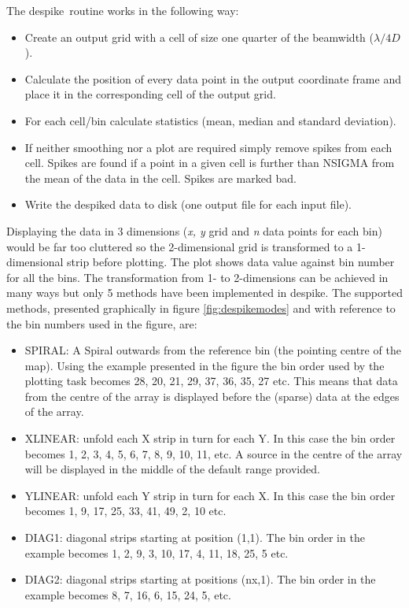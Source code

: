 \documentclass[twoside,11pt]{article}
\newcommand{\task}[1]{{\sf #1}}
\newcommand{\despike}{\htmlref{\task{despike}}{DESPIKE}}
\newcommand{\htmlref}[2]{#1}
\begin{document}
  The \despike\ routine works in the following way:
     
\begin{itemize}
\item Create an output grid with a cell of size one quarter of the beamwidth ($\lambda/4D$).
\item Calculate the position of every data point in the output coordinate
           frame and place it in the corresponding cell of the output grid.
\item For each cell/bin calculate statistics (mean, median and standard
           deviation).
\item If neither smoothing nor a plot are required simply remove spikes
           from each cell. Spikes are found if a point in a given cell is
further than  NSIGMA from the mean of the data in the cell. Spikes are marked
bad. 
\item Write the despiked data to disk (one output file for each input
           file).

\end{itemize}

Displaying the data in 3 dimensions (\textit{x, y} grid and \textit{n} data points
for each bin) would be far too cluttered so the 2-dimensional grid is
transformed to a 1-dimensional strip before plotting. The plot shows data
value against bin  number for all the bins. The transformation from 1- to
2-dimensions can be achieved in many ways but only 5 methods have been
implemented in \despike.  The supported methods, presented graphically in
figure \ref{fig:despikemodes} and with reference to the bin numbers used in
the figure, are:


\begin{itemize} 

\item SPIRAL: A Spiral
outwards from the reference bin (the pointing centre of the map). Using the example presented in the figure
the bin order used by the plotting task becomes 28, 20, 21, 29, 37, 36, 35,
27 etc. This means that data from the centre of the array is displayed before
the (sparse) data at the edges of the array.

	\item XLINEAR: unfold each X strip in turn for each Y. In this case
the bin order becomes 1, 2, 3, 4, 5, 6, 7, 8, 9, 10, 11, etc. A source in
the centre of the array will be displayed in the middle of the default range
provided. 

	\item YLINEAR:  unfold each Y strip in turn for each X. In this case
the bin order becomes 1, 9, 17, 25, 33, 41, 49, 2, 10 etc.    

	\item DIAG1:    diagonal strips starting at position (1,1). The bin
order in the example becomes 1, 2, 9, 3, 10, 17, 4, 11, 18, 25, 5 etc.

	\item DIAG2:   diagonal strips starting at positions (nx,1). The bin 
order in the example becomes 8, 7, 16, 6, 15, 24, 5, etc.
	
\end{itemize}
\end{document}
